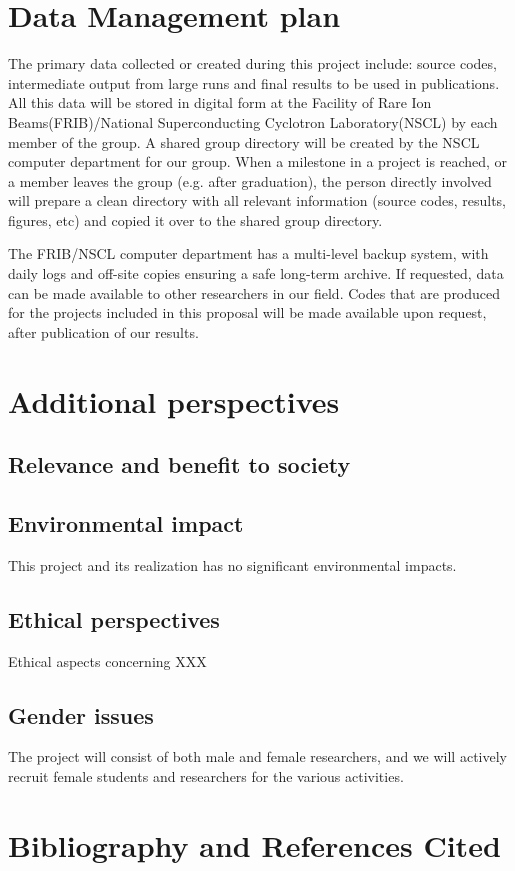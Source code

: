 \documentclass[10pt]{article}
\begin{document}
\section{Data Management plan}


The primary data collected or created during this project include:
source codes, intermediate output from large runs and final results to
be used in publications. All this data will be stored in digital form
at the Facility of Rare Ion Beams(FRIB)/National Superconducting
Cyclotron Laboratory(NSCL) by each member of the group.  A shared
group directory will be created by the NSCL computer department for
our group. When a milestone in a project is reached, or a member
leaves the group (e.g. after graduation), the person directly involved
will prepare a clean directory with all relevant information (source
codes, results, figures, etc) and copied it over to the shared group
directory.
 
The FRIB/NSCL computer department has a multi-level backup system, with
daily logs and off-site copies ensuring a safe long-term archive.  If
requested, data can be made available to other researchers in our
field. Codes that are produced for the projects included in this
proposal will be made available upon request, after publication of our
results.

\section{Additional perspectives}

\subsection{Relevance and benefit to society}



\subsection{Environmental impact}

This project and its realization has no  significant environmental impacts.

\subsection{Ethical perspectives}

Ethical aspects concerning XXX

\subsection{Gender issues}


The project will consist of both male and female researchers, and we
will actively recruit female students and researchers for the various activities. 

\section{Bibliography and References Cited}


\end{document}
